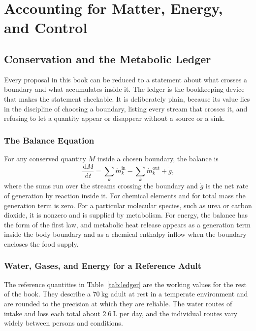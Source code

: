 \documentclass[11pt,openany]{book}
\theoremstyle{definition}
\theoremstyle{remark}
\newcommand{\dd}{\,\mathrm{d}}
\begin{document}
\part{Accounting for Matter, Energy, and Control}

\chapter{Conservation and the Metabolic Ledger}
\label{ch:ledger}

Every proposal in this book can be reduced to a statement about what crosses a boundary and what accumulates inside it. The ledger is the bookkeeping device that makes the statement checkable. It is deliberately plain, because its value lies in the discipline of choosing a boundary, listing every stream that crosses it, and refusing to let a quantity appear or disappear without a source or a sink.

\section{The Balance Equation}

For any conserved quantity $M$ inside a chosen boundary, the balance is
\begin{equation}
\frac{\dd M}{\dd t}=\sum_{k}\dot m_{k}^{\mathrm{in}}-\sum_{k}\dot m_{k}^{\mathrm{out}}+\dot g,
\label{eq:balance}
\end{equation}
where the sums run over the streams crossing the boundary and $\dot g$ is the net rate of generation by reaction inside it. For chemical elements and for total mass the generation term is zero. For a particular molecular species, such as urea or carbon dioxide, it is nonzero and is supplied by metabolism. For energy, the balance has the form of the first law, and metabolic heat release appears as a generation term inside the body boundary and as a chemical enthalpy inflow when the boundary encloses the food supply.

\section{Water, Gases, and Energy for a Reference Adult}

The reference quantities in Table~\ref{tab:ledger} are the working values for the rest of the book. They describe a $70\ \mathrm{kg}$ adult at rest in a temperate environment and are rounded to the precision at which they are reliable. The water routes of intake and loss each total about $2.6\ \mathrm{L}$ per day, and the individual routes vary widely between persons and conditions.
\end{document}
